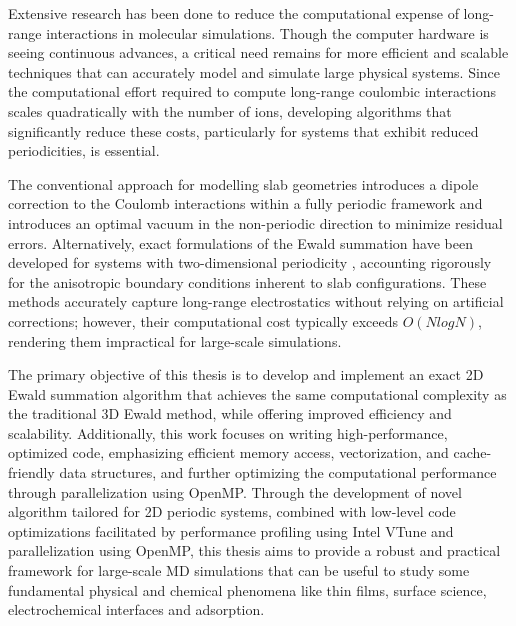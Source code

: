 Extensive research has been done to reduce the computational expense of long-range interactions in molecular simulations. Though the computer hardware is seeing continuous advances, a critical need remains for more efficient and scalable techniques that can accurately model and simulate large physical systems. Since the computational effort required to compute long-range coulombic interactions scales quadratically with the number of ions, developing algorithms that significantly reduce these costs, particularly for systems that exhibit reduced periodicities, is essential. 

The conventional approach for modelling slab geometries introduces a dipole correction \cite{dipole-yeh-berkowitz} to the Coulomb interactions within a fully periodic framework and introduces an optimal vacuum in the non-periodic direction to minimize residual errors. Alternatively, exact formulations of the Ewald summation have been developed for systems with two-dimensional periodicity \cite{kawata,PARRY1975433,de1979electrostatic,Heyes19771485}, accounting rigorously for the anisotropic boundary conditions inherent to slab configurations. These methods accurately capture long-range electrostatics without relying on artificial corrections; however, their computational cost typically exceeds $O(NlogN)$, rendering them impractical for large-scale simulations.

The primary objective of this thesis is to develop and implement an exact 2D Ewald summation algorithm that achieves the same computational complexity as the traditional 3D Ewald method, while offering improved efficiency and scalability. Additionally, this work focuses on writing high-performance, optimized code, emphasizing efficient memory access, vectorization, and cache-friendly data structures, and further optimizing the computational performance through parallelization using OpenMP. Through the development of novel algorithm tailored for 2D periodic systems, combined with low-level code optimizations facilitated by performance profiling using Intel\textsuperscript{\textregistered} VTune and parallelization using OpenMP, this thesis aims to provide a robust and practical framework for large-scale \acs{MD} simulations that can be useful to study some fundamental physical and chemical phenomena like thin films, surface science,  electrochemical interfaces and adsorption.